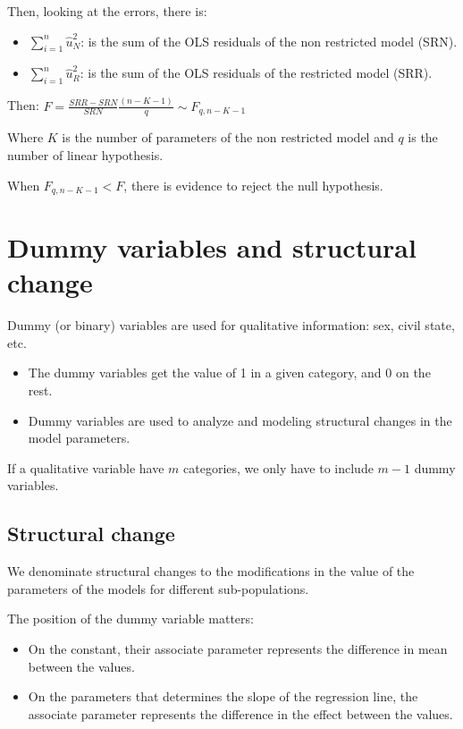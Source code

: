 \documentclass[10pt,landscape]{article}
\begin{document}
\begin{multicols}{3}
Then, looking at the errors, there is:

\begin{itemize}[leftmargin=*]
\item $\sum_{i=1}^n \hat{u}_N^2$: is the sum of the OLS residuals of the non restricted model (SRN).
\item $\sum_{i=1}^n \hat{u}_R^2$: is the sum of the OLS residuals of the restricted model (SRR).
\end{itemize}

Then: $F = \frac{SRR - SRN}{SRN} \frac{(n-K-1)}{q} \sim F_{q, n-K-1}$

Where $K$ is the number of parameters of the non restricted model and $q$ is the number of linear hypothesis.

When $F_{q, n-K-1} < F$, there is evidence to reject the null hypothesis.

\section*{Dummy variables and structural change}

Dummy (or binary) variables are used for qualitative information: sex, civil state, etc.

\begin{itemize}[leftmargin=*]
\item The dummy variables get the value of 1 in a given category, and 0 on the rest.
\item Dummy variables are used to analyze and modeling structural changes in the model parameters.
\end{itemize}

If a qualitative variable have $m$ categories, we only have to include $m-1$ dummy variables.

\subsection*{Structural change}

We denominate structural changes to the modifications in the value of the parameters of the models for different sub-populations.

The position of the dummy variable matters:
\begin{itemize}[leftmargin=*]
\item On the constant, their associate parameter represents the difference in mean between the values.
\item On the parameters that determines the slope of the regression line, the associate parameter represents the difference in the effect between the values.
\end{itemize}


\end{multicols}
\end{document}
